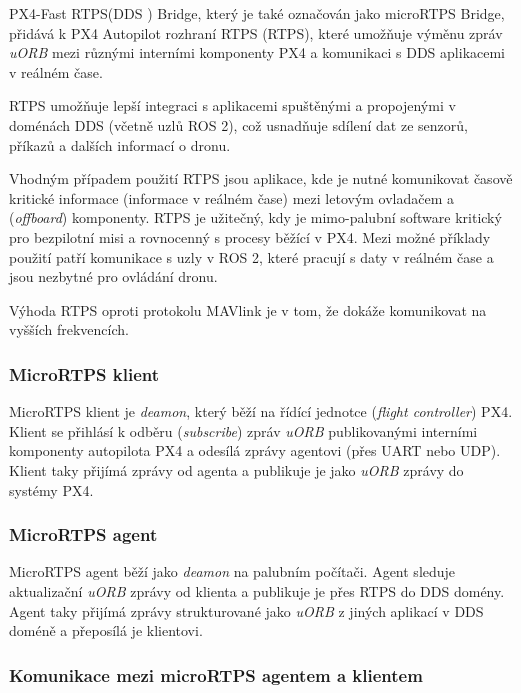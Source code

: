 PX4-Fast RTPS(\acs{DDS} ) Bridge, který je také označován jako microRTPS Bridge, přidává k PX4 Autopilot rozhraní \acs{RTPS} (\acl{RTPS}), které umožňuje výměnu zpráv \textit{uORB} mezi různými interními komponenty PX4 a  komunikaci s \acs{DDS} aplikacemi v reálném čase.

\acs{RTPS} umožňuje lepší integraci s aplikacemi spuštěnými a propojenými v doménách \acs{DDS} (včetně uzlů ROS 2), což usnadňuje sdílení dat ze senzorů, příkazů a dalších informací o dronu.

Vhodným případem použití \acs{RTPS} jsou aplikace, kde je nutné komunikovat časově kritické informace (informace v reálném čase) mezi letovým ovladačem a  (\textit{offboard}) komponenty. \acs{RTPS} je užitečný, kdy je mimo-palubní software kritický pro bezpilotní misi a rovnocenný s procesy běžící v PX4. Mezi možné příklady použití patří komunikace s uzly v ROS 2, které pracují s daty v reálném čase a jsou nezbytné pro ovládání dronu.

Výhoda \acs{RTPS} oproti protokolu MAVlink je v tom, že dokáže komunikovat na vyšších frekvencích. \cite{PX4docs}

\subsubsection{MicroRTPS klient}

MicroRTPS klient je \textit{deamon}, který běží na řídící jednotce (\textit{flight controller}) PX4. Klient se přihlásí k odběru (\textit{subscribe}) zpráv \textit{uORB} publikovanými interními komponenty autopilota PX4 a odesílá zprávy agentovi (přes UART nebo UDP). Klient taky přijímá zprávy od agenta a publikuje je jako \textit{uORB} zprávy do systémy PX4. \cite{PX4docs}

\subsubsection{MicroRTPS agent}

MicroRTPS agent běží jako \textit{deamon} na palubním počítači. Agent sleduje aktualizační \textit{uORB} zprávy od klienta a publikuje je přes \acs{RTPS} do \acs{DDS} domény. Agent taky přijímá zprávy strukturované jako \textit{uORB} z jiných aplikací v \acs{DDS} doméně a přeposílá je klientovi.

\subsubsection{Komunikace mezi microRTPS agentem a klientem}

